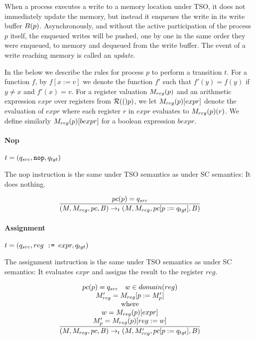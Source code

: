 \documentclass[a4paper]{article}
\begin{document}
When a process executes a write to a memory location under TSO, it
does not immediately update the memory, but instead it enqueues the
write in its write buffer $B(p)$. Asynchronously, and without the
active participation of the process $p$ itself, the enqueued writes
will be pushed, one by one in the same order they were enqueued, to
memory and dequeued from the write buffer. The event of a write
reaching memory is called an \emph{update}.

In the below we describe the rules for process $p$ to perform a
transition $t$. For a function $f$, by $f[x:=v]$ we denote the
function $f'$ such that $f'(y) = f(y)$ if $y \neq x$ and $f'(x) =
v$. For a register valuation $M_{reg}(p)$ and an arithmetic expression
$expr$ over registers from $\mathcal{R}(()p)$, we let $M_{reg}(p)[expr]$
denote the evaluation of $expr$ where each register $r$ in $expr$
evaluates to $M_{reg}(p)(r)$. We define similarly $M_{reg}(p)[bexpr]$
for a boolean expression $bexpr$. 

\newcommand{\sep}{\rule{10pt}{0pt}}

\paragraph{Nop} $t = (q_{src},\verb+nop+,q_{tgt})$

The nop instruction is the same under TSO semantics as under SC
semantics: It does nothing.

\begin{displaymath}
  \frac{
    pc(p) = q_{src}
  }{(M,M_{reg},pc,B) \rightarrow_t (M,M_{reg},pc[p:=q_{tgt}],B)}
\end{displaymath}

\paragraph{Assignment} $t = (q_{src},reg\verb+ := +expr, q_{tgt})$

The assignment instruction is the same under TSO semantics as under SC
semantics: It evaluates $expr$ and assigns the result to the register
$reg$.

\begin{displaymath}
  \frac{
    \begin{array}{c}
      \pc(p) = q_{src} \sep 
      w \in domain(reg)\\
      \regval' = \regval[p:=M_p']\\
      \textrm{where}\\
      w = \regval(p)[expr]\\
      M_p' = \regval(p)[reg:=w]\\
    \end{array}
  }
       {(\mem,\regval,\pc,\buf) \rightarrow_t (\mem,\regval',\pc[p:=q_{tgt}],\buf)}
\end{displaymath}
\end{document}
